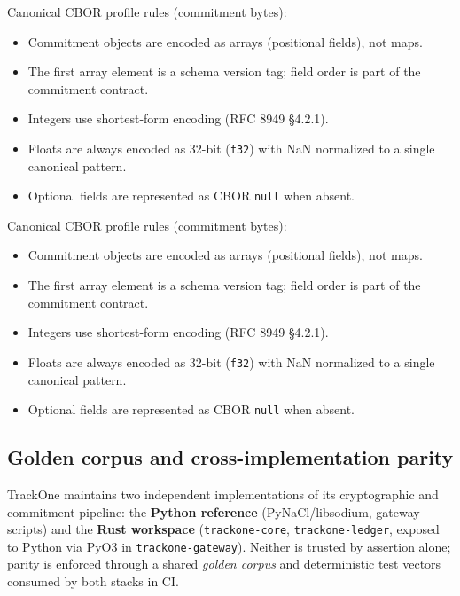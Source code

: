 Canonical \ac{CBOR} profile rules (commitment bytes):
\begin{itemize}[nosep]
    \item Commitment objects are encoded as arrays (positional fields), not maps.
    \item The first array element is a schema version tag; field order is part of the commitment contract.
    \item Integers use shortest-form encoding (\ac{RFC} 8949 \S4.2.1).
    \item Floats are always encoded as 32-bit (\texttt{f32}) with NaN normalized to a single canonical pattern.
    \item Optional fields are represented as \ac{CBOR} \texttt{null} when absent.
\end{itemize}

Canonical \ac{CBOR} profile rules (commitment bytes):
\begin{itemize}[nosep]
    \item Commitment objects are encoded as arrays (positional fields), not maps.
    \item The first array element is a schema version tag; field order is part of the commitment contract.
    \item Integers use shortest-form encoding (\ac{RFC} 8949 \S4.2.1).
    \item Floats are always encoded as 32-bit (\texttt{f32}) with NaN normalized to a single canonical pattern.
    \item Optional fields are represented as \ac{CBOR} \texttt{null} when absent.
\end{itemize}

\subsection{Golden corpus and cross-implementation parity}
\label{subsec:golden-corpus}

TrackOne maintains two independent implementations of its cryptographic and commitment pipeline:
the \textbf{Python reference} (PyNaCl/libsodium, gateway scripts) and the \textbf{Rust workspace}
(\texttt{trackone-core}, \texttt{trackone-ledger}, exposed to Python via PyO3 in \texttt{trackone-gateway}).
Neither is trusted by assertion alone; parity is enforced through a shared \emph{golden corpus} and
deterministic test vectors consumed by both stacks in \ac{CI}.

